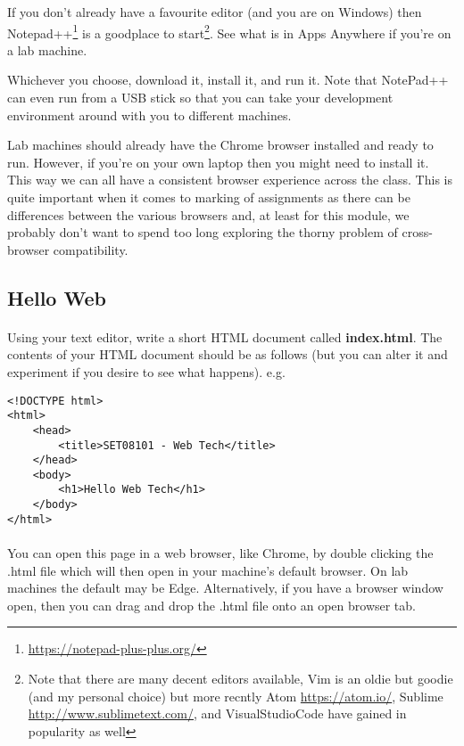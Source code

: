 \documentclass[10pt, a4paper]{article}
\begin{document}
If you don't already have a favourite editor (and you are on Windows) then Notepad++\footnote{\url{https://notepad-plus-plus.org/}} is a goodplace to start\footnote{Note that there are many decent editors available, Vim is an oldie but goodie (and my personal choice) but more recntly Atom \url{https://atom.io/}, Sublime \url{http://www.sublimetext.com/}, and VisualStudioCode \url{} have gained in popularity as well}. See what is in Apps Anywhere if you're on a lab machine.

Whichever you choose, download it, install it, and run it. Note that NotePad++ can even run from a USB stick so that you can take your development environment around with you to different machines.

Lab machines should already have the Chrome browser installed and ready to run. However, if you're on your own laptop then you might need to install it. This way we can all have a consistent browser experience across the class. This is quite important when it comes to marking of assignments as there can be differences between the various browsers and, at least for this module, we probably don't want to spend too long exploring the thorny problem of cross-browser compatibility.

\subsection{Hello Web}

\paragraph{} Using your text editor, write a short HTML document called {\bf index.html}. The contents of your HTML document should be as follows (but you can alter it and experiment if you desire to see what happens). e.g.

\begin{lstlisting}
<!DOCTYPE html>
<html>
    <head>
        <title>SET08101 - Web Tech</title>
    </head>
    <body>
        <h1>Hello Web Tech</h1>
    </body>
</html>
\end{lstlisting}

\paragraph{} You can open this page in a web browser, like Chrome, by double clicking the .html file which will then open in your machine's default browser. On lab machines the default may be Edge. Alternatively, if you have a browser window open, then you can drag and drop the .html file onto an open browser tab.
\end{document}
